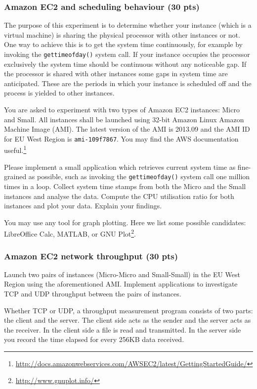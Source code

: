 \documentclass[12pt, a4paper]{article}
\begin{document}
\subsubsection{Amazon EC2 and scheduling behaviour (30 pts)}
The purpose of this experiment is to determine whether your instance (which is a virtual machine) is sharing the physical processor with other instances or not.
One way to achieve this is to get the system time continuously, for example by invoking the \texttt{gettimeofday()} system call.
If your instance occupies the processor exclusively the system time should be continuous without any noticeable gap.
If the processor is shared with other instances some gaps in system time are anticipated.
These are the periods in which your instance is scheduled off and the process is yielded to other instances.

You are asked to experiment with two types of Amazon EC2 instances: Micro and Small.
All instances shall be launched using 32-bit Amazon Linux Amazon Machine Image (AMI).
The latest version of the AMI is 2013.09 and the AMI ID for EU West Region is \texttt{ami-109f7867}.
You may find the AWS documentation useful.\footnote{\url{http://docs.amazonwebservices.com/AWSEC2/latest/GettingStartedGuide/}}

Please implement a small application which retrieves current system time as fine-grained as possible, such as invoking the \texttt{gettimeofday()} system call one million times in a loop.
Collect system time stamps from both the Micro and the Small instances and analyse the data.
Compute the CPU utilisation ratio for both instances and plot your data.
Explain your findings.

You may use any tool for graph plotting.
Here we list some possible candidates: LibreOffice Calc, MATLAB, or GNU Plot\footnote{\url{http://www.gnuplot.info/}}.

\subsubsection{Amazon EC2 network throughput (30 pts)}
Launch two pairs of instances (Micro-Micro and Small-Small) in the EU West Region using the aforementioned AMI.
Implement applications to investigate TCP and UDP throughput between the pairs of instances.

Whether TCP or UDP, a throughput measurement program consists of two parts: the client and the server.
The client side acts as the sender and the server acts as the receiver.
In the client side a file is read and transmitted.
In the server side you record the time elapsed for every 256KB data received.
\end{document}
